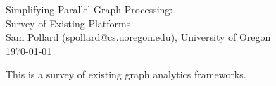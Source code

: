 \documentclass[11pt]{article}
\begin{document}
\begin{center}
{ \huge
	Simplifying Parallel Graph Processing: \\
}
{ \Large
	Survey of Existing Platforms \\
}
Sam Pollard (\href{mailto:spollard@cs.uoregon.edu}{spollard@cs.uoregon.edu}), University of Oregon \\
\today
\end{center}

This is a survey of existing graph analytics frameworks.
\end{document}
